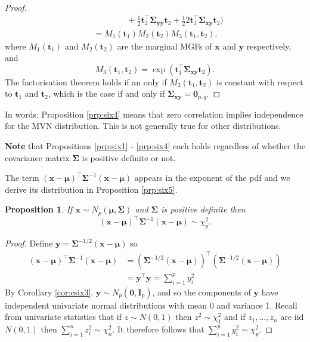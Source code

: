\documentclass[]{book}
\newtheorem{proposition}{Proposition}[chapter]
\theoremstyle{definition}
\theoremstyle{definition}
\theoremstyle{definition}
\theoremstyle{remark}
\begin{document}
\begin{proof}
\begin{align*}
& \qquad \qquad +\frac{1}{2}{\boldsymbol t}_2^\top  \boldsymbol \Sigma_{\boldsymbol y\boldsymbol y}{\boldsymbol t}_2+\frac{1}{2} 2{\boldsymbol t}_1^\top \boldsymbol \Sigma_{\boldsymbol x\boldsymbol y}{\boldsymbol t}_2 \bigg)\\
&=M_1({\boldsymbol t}_1)M_2({\boldsymbol t}_2)M_3({\boldsymbol t}_1, {\boldsymbol t}_2),
\end{align*}
where \(M_1({\boldsymbol t}_1)\) and \(M_2({\boldsymbol t}_2)\) are the marginal MGFs of \(\boldsymbol x\) and \(\boldsymbol y\) respectively, and
\[
M_3({\boldsymbol t}_1, {\boldsymbol t}_2)=\exp\left ({\boldsymbol t}_1^\top \boldsymbol \Sigma_{\boldsymbol x\boldsymbol y}{\boldsymbol t}_2 \right ).
\]
The factorisation theorem holds if an only if \(M_3({\boldsymbol t}_1, {\boldsymbol t}_2)\) is constant with respect to
\({\boldsymbol t}_1\) and \({\boldsymbol t}_2\), which is the case if and only if \(\boldsymbol \Sigma_{\boldsymbol x\boldsymbol y}={\mathbf 0}_{p,q}\).
\end{proof}

In words: Proposition \ref{prp:six4} means that zero correlation implies independence for the MVN distribution. This is not generally true for other distributions.

\textbf{Note} that Propositions \ref{prp:six1} - \ref{prp:six4} each holds regardless of whether the covariance matrix \(\boldsymbol \Sigma\) is positive definite or not.

The term \((\boldsymbol x-\boldsymbol \mu)^\top \boldsymbol \Sigma^{-1} (\boldsymbol x-\boldsymbol \mu)\) appears in the exponent of the pdf and we derive its distribution in Proposition \ref{prp:six5}.

\begin{proposition}
\protect\hypertarget{prp:six5}{}{\label{prp:six5} }If \(\boldsymbol x\sim N_p(\boldsymbol \mu, \boldsymbol \Sigma)\) and \(\boldsymbol \Sigma\) is positive definite then
\[(\boldsymbol x-\boldsymbol \mu)^\top \boldsymbol \Sigma^{-1} (\boldsymbol x-\boldsymbol \mu) \sim \chi_p^2.\]
\end{proposition}

\begin{proof}
{}Define \(\boldsymbol y= \boldsymbol \Sigma^{-1/2} (\boldsymbol x-\boldsymbol \mu)\) so
\begin{align*}
(\boldsymbol x-\boldsymbol \mu)^\top \boldsymbol \Sigma^{-1} (\boldsymbol x-\boldsymbol \mu) &= \left(\boldsymbol \Sigma^{-1/2} (\boldsymbol x-\boldsymbol \mu) \right)^\top \left(\boldsymbol \Sigma^{-1/2} (\boldsymbol x-\boldsymbol \mu) \right)\\
&= \boldsymbol y^\top \boldsymbol y= \sum_{i=1}^p y_i^2
\end{align*}
By Corollary \ref{cor:csix3}, \(\boldsymbol y\sim N_p (\boldsymbol 0, \boldsymbol I_p)\), and so the components of \(\boldsymbol y\) have independent univariate normal distributions with mean 0 and variance 1. Recall from univariate statistics that if \(z \sim N(0,1)\) then \(z^2 \sim \chi^2_1\) and if \(z_1, \ldots, z_n\) are iid \(N(0,1)\) then \(\sum_{i=1}^n z_i^2 \sim \chi_n^2\). It therefore follows that \(\sum_{i=1}^p y_i^2 \sim \chi^2_p\).
\end{proof}
\end{document}
